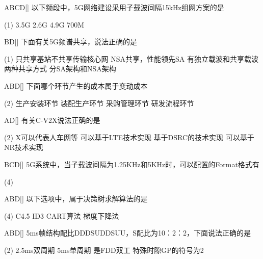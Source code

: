 \begin{choice}{\;ABCD\;}[]
	以下频段中，5G网络建设采用子载波间隔15kHz组网方案的是
	\begin{tasks}(1)
		\task3.5G
		\task 2.6G
		\task 4.9G
		\task 700M
	\end{tasks}
\end{choice}

\begin{choice}{\;BD\;}[]
	下面有关5G频谱共享，说法正确的是
	\begin{tasks}(1)
		\task 只共享基站不共享传输核心网
		\task NSA共享，性能领先SA
		\task 有独立载波和共享载波两种共享方式
		\task 分SA架构和NSA架构
	\end{tasks}
\end{choice}

\begin{choice}{\;ABD\;}[]
	下面哪个环节产生的成本属于变动成本
	\begin{tasks}(2)
		\task 生产安装环节
		\task 装配生产环节
		\task 采购管理环节
		\task 研发流程环节
	\end{tasks}
\end{choice}

\begin{choice}{\;AD\;}[]
	有关C-V2X说法正确的是
	\begin{tasks}(2)
		\task X可以代表人车网等
		\task 可以基于LTE技术实现
		\task  基于DSRC的技术实现
		\task 可以基于NR技术实现
	\end{tasks}
\end{choice}

\begin{choice}{\;BCD\;}[]
	5G系统中，当子载波间隔为1.25KHz和5KHz时，可以配置的Format格式有
	\begin{tasks}(4)
	\end{tasks}
\end{choice}

\begin{choice}{\;ABD\;}[]
	以下选项中，属于决策树求解算法的是
	\begin{tasks}(4)
		\task  C4.5
		\task ID3
		\task CART算法
		\task 梯度下降法
	\end{tasks}
\end{choice}

\begin{choice}{\;ABD\;}[]
	5ms帧结构配比DDDSUDDSUU，S配比为10：2：2，下面说法正确的是
	\begin{tasks}(2)
		\task 2.5ms双周期
		\task 5ms单周期
		\task 是FDD双工
		\task 特殊时隙GP的符号为2
	\end{tasks}
\end{choice}

